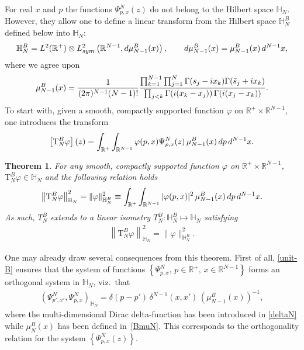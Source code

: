 \documentclass[11pt]{article}
\numberwithin{equation}{section}
\numberwithin{equation}{section}
\newtheorem{Theorem}{Theorem}[section]
\begin{document}
For real $x$ and $p$ the functions $\Psi^N_{p, x}({z})$ do not belong to the Hilbert space $\mathbb H_N$. However, they allow one to
define a linear transform from the Hilbert space $\mathbb H_N^B$ defined below into $\mathbb H_N$:
\begin{gather*}
\mathbb H_N^B =L^2(\mathbb R^+)\otimes L^2_{\rm sym}\left(\mathbb R^{N-1},{\rm d}\mu^B_{N-1}(x)\right), \qquad
{\rm d}\mu^B_{N-1}(x)=\mu^B_{N-1}(x)\, {\rm d}^{N-1}x,
\end{gather*}
where we agree upon
\begin{gather}\label{BmuN}
\mu_{N-1}^{B}(x)=\frac1{(2\pi)^{N-1} (N-1)!}
\frac{\prod_{k=1}^{N-1}\prod_{j=1}^N\Gamma(s_j-{\rm i}x_k)\Gamma(\bar s_j+{\rm i}x_k)}
{\prod_{j< k}\Gamma({\rm i}(x_k-x_j))\,\Gamma({\rm i}(x_j-x_k))}.
\end{gather}
To start with, given a smooth, compactly supported function $\varphi$ on $\mathbb{R}^+\times\mathbb{R}^{N-1}$, one introduces the transform
\begin{gather}\label{Bclosed-map}
\left[ \mathrm T_{N}^{B}\varphi\right]( z)
=\int_{\mathbb R^+} \int_{\mathbb R^{N-1}} \varphi(p, x)
 \Psi^N_{p,{x}}({z})\, \mu_{N-1}^{B}( x)\, {\rm d}p\, {\rm d}^{N-1} x.
\end{gather}


\begin{Theorem}
For any smooth, compactly supported function $\varphi$ on $\mathbb{R}^+\times\mathbb{R}^{N-1}$,
 $ \mathrm T_{N}^{B}\varphi \in \mathbb{H}_N$ and the following relation holds
\begin{gather}\label{unit-B}
\left\|\mathrm T_{N}^{B}\varphi\right\|_{\mathbb H_N}^2=\|{\varphi}\|_{\mathbb H_N^{B}}^2
\equiv \int_{\mathbb R^+} \int_{\mathbb R^{N-1}} |\varphi(p, x)|^2\,
 \mu_{N-1}^{B}( x) \,{\rm d}p\, {\rm d}^{N-1} x.
\end{gather}
As such, $T_{N}^{B}$ extends to a linear isometry $T_{N}^{B}\colon \mathbb H_N^B \mapsto \mathbb H_N$ satisfying
\begin{gather*}
\left\|\mathrm T_{N}^{B}\varphi\right\|_{\mathbb H_N}^2=\|{\varphi}\|_{\mathbb H_N^{B}}^2 .
\end{gather*}
\end{Theorem}

One may already draw several consequences from this theorem. First of all, \eqref{unit-B} ensures that the system of functions
$\left\{\Psi^{N}_{p,{x}},\, p\in \mathbb R^+, \,x \in \mathbb R^{N-1}\right\}$ forms an orthogonal system in $\mathbb H_N$, viz.~that
\begin{gather*}%
\left(\Psi^N_{p', x'}, \Psi^N_{p,{x}}\right)_{\mathbb{H}_N}= \delta(p-p')\,
\delta^{N-1}( x , x') \, \left(\mu_{N-1}^{B}( x)\right)^{-1}\!,
\end{gather*}
where the multi-dimensional Dirac delta-function has been introduced in \eqref{deltaN} while $\mu_N^{B}( x)$ has been defined in~\eqref{BmuN}. This corresponds to the orthogonality relation for the system $\left\{\Psi^N_{p,{x}}(z)\right\}$.
\end{document}
